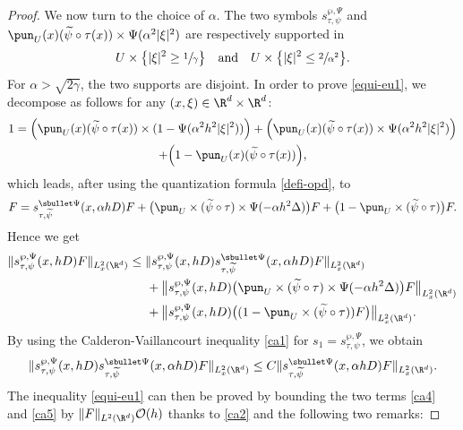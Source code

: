 \begin{proof}
We now turn to the choice of $\alpha$. The two symbols $s_{\tau,\psi}^{\wp,\Psi}$ and $\pun_{U}(x)(\widetilde{\psi}\circ \tau(x))\times \Psi(\alpha^2 |\xi|^2)$ are respectively supported in
\begin{equation*} U\times \bigl\{|\xi|^2\geq \sfrac{1}{\gamma}\bigr\} \quad \text{and} \quad U\times \bigl\{ |\xi|^2 \leq \sfrac{2}{\alpha^2}\bigr\}.
\end{equation*}
For $\alpha>\sqrt{2\gamma}$, the two supports are disjoint.
In order to prove \eqref{equi-eu1}, we decompose as follows for any $(x,\xi)\in \R^d\times \R^d$:
\begin{multline*}
1 = \Big(\pun_{U}(x) (\widetilde{\psi}\circ \tau(x)) \times (1-\Psi(\alpha^2 h^2 |\xi|^2))\Big)+\Big(\pun_{U}(x)
(\widetilde{\psi}\circ \tau(x))\times \Psi(\alpha^2 h^2 |\xi|^2)\Big)\\
+\Big(1-\pun_{U}(x)(\widetilde{\psi}\circ \tau(x)) \Big),
\end{multline*}
which leads, after using the quantization formula \eqref{defi-opd}, to
\begin{equation}\label{ca3}
F= s_{\tau,\widetilde{\psi}}^{\sbullet\Psi}(x,\alpha hD)F + \bigl(\pun_{U}\times (\widetilde{\psi}\circ \tau)\times \Psi(-\alpha h^2 \Delta) \bigr)F 
+ \bigl(1-\pun_{U}\times (\widetilde{\psi}\circ\tau) \bigr)F.
\end{equation}
Hence we get
\begin{align}\nonumber
\|s_{\tau,\psi}^{\wp,\Psi}(x,hD)F\|_{L_x^2(\R^d)} &\leq \|s_{\tau,\psi}^{\wp,\Psi}(x,hD) s_{\tau,\widetilde{\psi}}^{\sbullet\Psi}(x,\alpha h D) F\|_{L_x^2(\R^d)} \\ \label{ca4}
&\hspace*{5mm} + \bigl\| s_{\tau,\psi}^{\wp,\Psi}(x,hD)\bigl(\pun_{U}\times (\widetilde{\psi}\circ \tau)\times \Psi(-\alpha h^2 \Delta)\bigr) F \bigr\|_{L_x^2(\R^d)}\\ \label{ca5}
& \hspace*{5mm}+ \bigl\|s_{\tau,\psi}^{\wp,\Psi}(x,hD)\bigl((1-\pun_{U}\times (\widetilde{\psi}\circ \tau))F\bigl)\bigl\|_{L_x^2(\R^d)}.
\end{align}
By using the Calderon-Vaillancourt inequality \eqref{ca1} for $s_1=s_{\tau,\psi}^{\wp,\Psi}$, we obtain
\begin{equation*}
\|s_{\tau,\psi}^{\wp,\Psi}(x,hD) s_{\tau,\widetilde{\psi}}^{\sbullet\Psi}(x,\alpha h D) F\|_{L_x^2(\R^d)}
\leq C\|s_{\tau,\widetilde{\psi}}^{\sbullet\Psi}(x,\alpha h D) F\|_{L_x^2(\R^d)}.
\end{equation*}
The inequality \eqref{equi-eu1} can then be proved by bounding the two terms \eqref{ca4} and \eqref{ca5} by $\|F\|_{L^2(\R^d)}\mathcal{O}(h)$ thanks to \eqref{ca2} and the following two remarks:

\end{proof}
